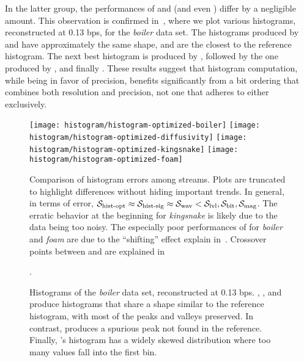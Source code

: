 In the latter group, the performances of \swav and \shsg (and even \shop) differ by a negligible
amount. This observation is confirmed in~, where we plot various
histograms, reconstructed at 0.13 bps, for the \emph{boiler} data set. The histograms produced by
\swav and \shsg have approximately the same shape, and are the closest to the reference histogram.
The next best histogram is produced by \slvl, followed by the one produced by \sbit, and finally
\smag. These results suggest that histogram computation, while being in favor of precision, benefits
significantly from a bit ordering that combines both resolution and precision, not one that adheres
to either exclusively.

\begin{figure*}[t]
	\centering
	{\texttt{[image: histogram/histogram-optimized-boiler]}}
	{\texttt{[image: histogram/histogram-optimized-diffusivity]}}
	{\texttt{[image: histogram/histogram-optimized-kingsnake]}}
	{\texttt{[image: histogram/histogram-optimized-foam]}}
	
	\caption{Comparison of histogram errors among streams. Plots are truncated to highlight
	differences without hiding important trends. In general, in terms of error, $\shop \approx \shsg
	\approx \swav < \slvl, \sbit, \smag$. The erratic behavior at the beginning for \emph{kingsnake}
	is likely due to the data being too noisy. The especially poor performances of \sbit for
	\emph{boiler} and \emph{foam} are due to the ``shifting'' effect explain in~.
	Crossover points between \sbit and \slvl are explained in~}.
	\label{fig:histogram-stream-comparison}
\vspace{1em}

	\centering
	\caption{Histograms of the \emph{boiler} data set, reconstructed at 0.13 bps. \slvl, \swav, and
	\shsg produce histograms that share a shape similar to the reference histogram, with most of the
	peaks and valleys preserved. In contrast, \sbit produces a spurious peak not found in the
	reference. Finally, \smag's histogram has a widely skewed distribution where too many values fall
	into the first bin.}
	\label{fig:histograms-boiler}
\end{figure*}


